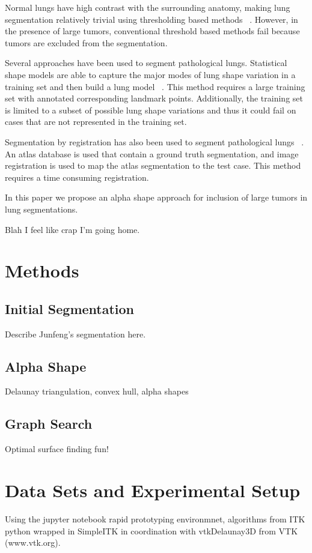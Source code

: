 \documentclass{llncs}
\begin{document}
Normal lungs have high contrast with the surrounding anatomy, making lung segmentation relatively trivial using thresholding based methods ~\cite{guo2008,hu2001}. However, in the presence of large tumors, conventional threshold based methods fail because tumors are excluded from the segmentation.

Several approaches have been used to segment pathological lungs. Statistical shape models are able to capture the major modes of lung shape variation in a training set and then build a lung model ~\cite{sun2012,sofka2011}. This method requires a large training set with annotated corresponding landmark points. Additionally, the training set is limited to a subset of possible lung shape variations and thus it could fail on cases that are not represented in the training set.

Segmentation by registration has also been used to segment pathological lungs ~\cite{sluimer2005,vanrikxoort2009}. An atlas database is used that contain a ground truth segmentation, and image registration is used to map the atlas segmentation to the test case. This method requires a time consuming registration.

In this paper we propose an alpha shape approach for inclusion of large tumors in lung segmentations. 

Blah I feel like crap I'm going home.



%
\section{Methods}
%

%
\subsection{Initial Segmentation}
%
Describe Junfeng's segmentation here.
%
\subsection{Alpha Shape}
%
Delaunay triangulation, convex hull, alpha shapes
%
\subsection{Graph Search}
%
Optimal surface finding fun!
%
\section{Data Sets and Experimental Setup}
%
Using the jupyter notebook \cite{PER-GRA:2007} rapid prototyping environmnet,  algorithms from ITK\cite{johnson2015itk} python wrapped in SimpleITK \cite{10.3389/fninf.2013.00045} in coordination with vtkDelaunay3D from VTK (www.vtk.org).
\end{document}
